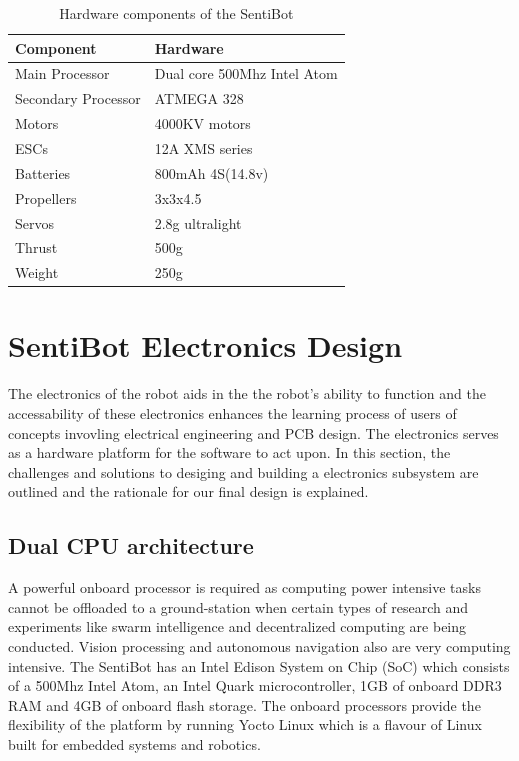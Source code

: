\documentclass[12pt]{article}
\begin{document}
\begin{table}[h]
	\centering
	\begin{tabular}{ | l | l | }
		Component & Hardware \\
		\hline
		Main Processor & Dual core 500Mhz Intel Atom \\
		Secondary Processor & ATMEGA 328 \\
		Motors & 4000KV motors \\
		ESCs & 12A XMS series \\
		Batteries & 800mAh 4S(14.8v) \\
		Propellers & 3x3x4.5 \\
		Servos & 2.8g ultralight \\
		Thrust & 500g \\
		Weight & 250g \\
	\end{tabular}
	\caption{Hardware components of the SentiBot}
	\label{fig:components}
\end{table}

\section{SentiBot Electronics Design}

The electronics of the robot aids in the the robot's ability to function and the accessability of these electronics enhances the learning process of users of concepts invovling electrical engineering and PCB design. The electronics serves as a hardware platform for the software to act upon. In this section, the challenges and solutions to desiging and building a electronics subsystem are outlined and the rationale for our final design is explained.

\subsection{Dual CPU architecture}

A powerful onboard processor is required as computing power intensive tasks cannot be offloaded to a ground-station when certain types of research and experiments like swarm intelligence and decentralized computing\cite{swarm} are being conducted. Vision processing and autonomous navigation also are very computing intensive\cite{vision}. The SentiBot has an Intel Edison System on Chip (SoC) which consists of a 500Mhz Intel Atom, an Intel Quark microcontroller, 1GB of onboard DDR3 RAM and 4GB of onboard flash storage. The onboard processors provide the flexibility of the platform by running Yocto Linux which is a flavour of Linux built for embedded systems and robotics. 
\end{document}
